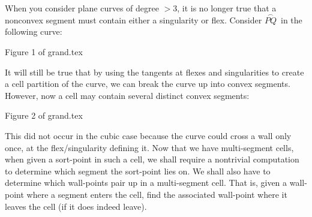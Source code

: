 %
\newtheorem{lemma}{Lemma}
\newtheorem{theorem}{Theorem}
\newtheorem{corollary}{Corollary}
\newtheorem{conjecture}{Conjecture}
%
\newcommand{\arc}[1]{\mbox{$\stackrel{\frown}{#1}$}}
\newcommand{\lyne}[1]{\mbox{$\stackrel{\leftrightarrow}{#1}$}}
\newcommand{\ray}[1]{\mbox{$\vec{#1}$}}
\newcommand{\seg}[1]{\mbox{$\overline{#1}$}}
\newcommand{\hence}{\\ \mbox{$.\raisebox{1.5ex}{.}.$}\ } %
\newcommand{\qed}{\nopagebreak\begin{flushright}\mbox{$\Box$}\end{flushright}}
\newcommand{\se}{\mbox{$_{\epsilon}$}}  %
\newcommand{\proof}{{\bf Proof}:\nopagebreak\\}
\newcommand{\wlogg}{\mbox{w.\ l.\ o.\ g.\ }}
\newcommand{\wrt}{\mbox{w.\ r.\ t.\ }}
\newcommand{\ww}{\mbox{$W_{1}W_{2}$}}
\newcommand{\wwa}{\arc{\ww}}
\newcommand{\wwh}{\mbox{$\widehat{\ww}$}}
\newcommand{\wone}{\mbox{$W_{1}$}}
\newcommand{\wtwo}{\mbox{$W_{2}$}}
\newcommand{\xone}{\mbox{$x_{1}$}}
\newcommand{\xtwo}{\mbox{$x_{2}$}}
\newcommand{\Rxy}{\mbox{$R_{xy}$}}
\newcommand{\defn}{{\bf Definition}:\ }
\newcommand{\fig}[2]{\begin{center}Figure #1 of #2\end{center}}
\newcommand{\ie}{i.\ e.\ }

%
When you consider plane curves of degree $> 3$, it 
is no longer true that a nonconvex segment must contain either a 
singularity or flex.
Consider \arc{PQ}\ in the following curve:
\begin{center}
Figure 1 of grand.tex
\end{center}
It will still be true that by using the tangents at flexes and singularities
to create a cell partition of the curve, we can break the curve up into
convex segments.
However, now a cell 
may contain several distinct convex segments:
\begin{center}
Figure 2 of grand.tex
\end{center}
This did not occur in the cubic case because the curve could cross a wall
only once, at the flex/singularity defining it.
Now that we have multi-segment cells, when given a sort-point in such a cell,
we shall require a nontrivial computation to determine which segment
the sort-point lies on.
We shall also have to determine which wall-points pair up in a multi-segment
cell.
That is, given a wall-point where a segment enters the cell, find the 
associated wall-point where it leaves the cell (if it does indeed leave).
